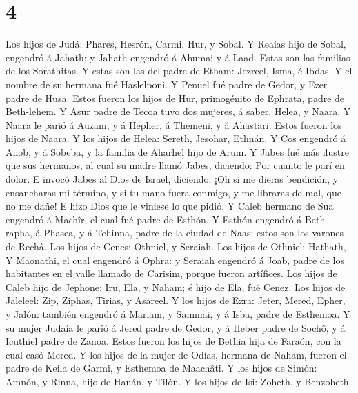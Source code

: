 \hypertarget{section-3}{%
\section{4}\label{section-3}}

 Los hijos de Judá: Phares, Hesrón, Carmi, Hur, y Sobal.
 Y Reaias hijo de Sobal, engendró á Jahath; y Jahath
engendró á Ahumai y á Laad. Estas son las familias de los Sorathitas.
 Y estas son las del padre de Etham: Jezreel, Isma, é
Ibdas. Y el nombre de su hermana fué Haslelponi.  Y Penuel
fué padre de Gedor, y Ezer padre de Husa. Estos fueron los hijos de Hur,
primogénito de Ephrata, padre de Beth-lehem.  Y Asur padre
de Tecoa tuvo dos mujeres, á saber, Helea, y Naara.  Y
Naara le parió á Auzam, y á Hepher, á Themeni, y á Ahastari. Estos
fueron los hijos de Naara.  Y los hijos de Helea: Sereth,
Jesohar, Ethnán.  Y Cos engendró á Anob, y á Sobeba, y la
familia de Aharhel hijo de Arum.  Y Jabes fué más ilustre
que sus hermanos, al cual su madre llamó Jabes, diciendo: Por cuanto le
parí en dolor.  E invocó Jabes al Dios de Israel,
diciendo: ¡Oh si me dieras bendición, y ensancharas mi término, y si tu
mano fuera conmigo, y me libraras de mal, que no me dañe! E hizo Dios
que le viniese lo que pidió.  Y Caleb hermano de Sua
engendró á Machîr, el cual fué padre de Esthón.  Y Esthón
engendró á Beth-rapha, á Phasea, y á Tehinna, padre de la ciudad de
Naas: estos son los varones de Rechâ.  Los hijos de
Cenes: Othniel, y Seraiah. Los hijos de Othniel: Hathath,
 Y Maonathi, el cual engendró á Ophra: y Seraiah engendró
á Joab, padre de los habitantes en el valle llamado de Carisim, porque
fueron artífices.  Los hijos de Caleb hijo de Jephone:
Iru, Ela, y Naham; é hijo de Ela, fué Cenez.  Los hijos
de Jaleleel: Zip, Ziphas, Tirias, y Asareel.  Y los hijos
de Ezra: Jeter, Mered, Epher, y Jalón: también engendró á Mariam, y
Sammai, y á Isba, padre de Esthemoa.  Y su mujer Judaía
le parió á Jered padre de Gedor, y á Heber padre de Sochô, y á Icuthiel
padre de Zanoa. Estos fueron los hijos de Bethia hija de Faraón, con la
cual casó Mered.  Y los hijos de la mujer de Odías,
hermana de Naham, fueron el padre de Keila de Garmi, y Esthemoa de
Maachâti.  Y los hijos de Simón: Amnón, y Rinna, hijo de
Hanán, y Tilón. Y los hijos de Isi: Zoheth, y Benzoheth. 
